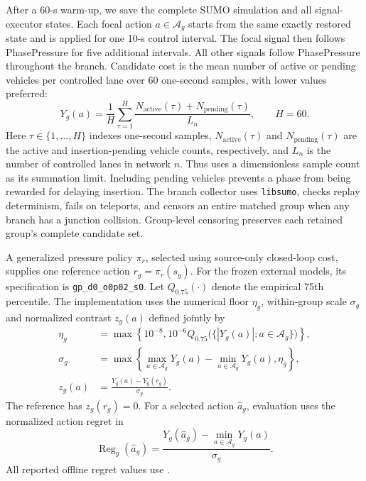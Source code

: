 After a 60-s warm-up, we save the complete SUMO simulation and all
signal-executor states.  Each focal action $a\in\mathcal{A}_g$ starts from
the same exactly restored state and is applied for one 10-s control interval.
The focal signal then follows PhasePressure for five additional intervals.
All other signals follow PhasePressure throughout the branch.  Candidate cost
is the mean number of active or pending vehicles per controlled lane over
60 one-second samples, with lower values preferred:
\begin{equation}
 Y_g(a)=\frac{1}{H}\sum_{\tau=1}^{H}
 \frac{N_{\mathrm{active}}(\tau)+N_{\mathrm{pending}}(\tau)}{L_n},
 \qquad H=60.
 \label{eq:counterfactual-cost}
\end{equation}
Here $\tau\in\{1,\ldots,H\}$ indexes one-second samples,
$N_{\mathrm{active}}(\tau)$ and $N_{\mathrm{pending}}(\tau)$ are the active
and insertion-pending vehicle counts, respectively, and $L_n$ is the number
of controlled lanes in network $n$.  Thus  uses a
dimensionless sample count as its summation limit.  Including pending vehicles
prevents a phase from being rewarded for delaying insertion.  The branch collector uses
\texttt{libsumo}, checks replay determinism, fails on teleports, and censors an
entire matched group when any branch has a junction collision.  Group-level
censoring preserves each retained group's complete candidate set.

A generalized pressure policy $\pi_r$, selected using source-only closed-loop
cost, supplies one reference action $r_g=\pi_r(s_g)$.  For the frozen external
models, its specification is \texttt{gp\_d0\_o0p02\_s0}.  Let
$Q_{0.75}(\cdot)$ denote the empirical 75th percentile.  The implementation
uses the numerical floor $\eta_g$, within-group scale $\sigma_g$ and normalized
contrast $z_g(a)$ defined jointly by
\begin{equation}
\begin{aligned}
 \eta_g &= \max\!\left\{10^{-8},
     10^{-6}Q_{0.75}\bigl(\{|Y_g(a)|:a\in\mathcal A_g\}\bigr)\right\},\\
 \sigma_g &= \max\!\left\{
      \max_{a\in\mathcal A_g}Y_g(a)-\min_{a\in\mathcal A_g}Y_g(a),
      \eta_g\right\},\\
 z_g(a) &= \frac{Y_g(a)-Y_g(r_g)}{\sigma_g}.
\end{aligned}
\label{eq:normalized-contrast}
\end{equation}
The reference has $z_g(r_g)=0$.  For a selected action $\widehat a_g$,
evaluation uses the normalized action regret in
\begin{equation}
 \operatorname{Reg}_g(\widehat a_g)
 =\frac{Y_g(\widehat a_g)-\min_{a\in\mathcal{A}_g}Y_g(a)}{\sigma_g}.
 \label{eq:action-regret}
\end{equation}
All reported offline regret values use .

